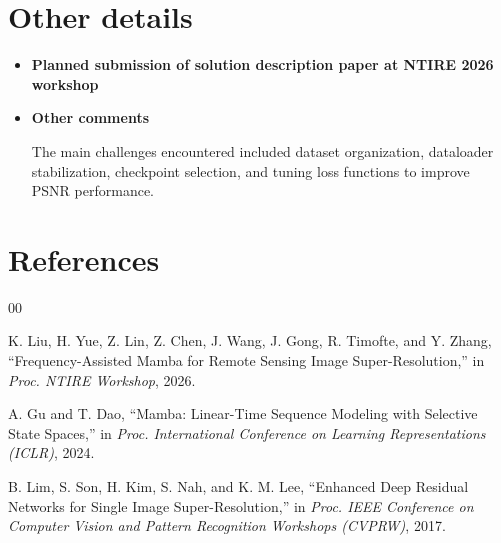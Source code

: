 \documentclass[conference]{IEEEtran}
\begin{document}
\section{Other details}

\begin{itemize}

\item \textbf{Planned submission of solution description paper at NTIRE 2026 workshop}

\item \textbf{Other comments}

The main challenges encountered included dataset organization, dataloader stabilization, checkpoint selection, and tuning loss functions to improve PSNR performance.

\end{itemize}
\section{References}
\vspace{-0.5cm}  %
\renewcommand{\refname}{} %
\begin{thebibliography}{00}

K. Liu, H. Yue, Z. Lin, Z. Chen, J. Wang, J. Gong, R. Timofte, and Y. Zhang,
``Frequency-Assisted Mamba for Remote Sensing Image Super-Resolution,''
in \textit{Proc. NTIRE Workshop}, 2026.

A. Gu and T. Dao,
``Mamba: Linear-Time Sequence Modeling with Selective State Spaces,''
in \textit{Proc. International Conference on Learning Representations (ICLR)}, 2024.


B. Lim, S. Son, H. Kim, S. Nah, and K. M. Lee,
``Enhanced Deep Residual Networks for Single Image Super-Resolution,''
in \textit{Proc. IEEE Conference on Computer Vision and Pattern Recognition Workshops (CVPRW)}, 2017.


\end{thebibliography}
\end{document}
